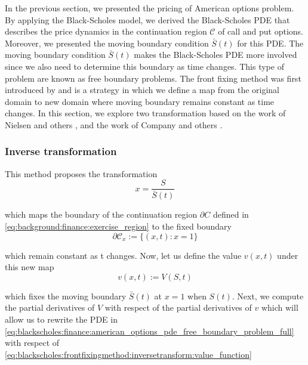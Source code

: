 In the previous section, we presented the pricing of American options problem.
By applying the Black-Scholes model, we derived the Black-Scholes PDE that describes 
the price dynamics in the continuation region $\mathcal{C}$ of call and put options.
Moreover, we presented the moving boundary condition $\bar{S}(t)$ for this PDE.
The moving boundary condition $\bar{S}(t)$ makes the Black-Scholes PDE more 
involved since we also need to determine this boundary as time changes. This type 
of problem are known as free boundary problems. The front fixing method
was first introduced by \cite{landau_1950_heat_ci} and is a strategy in which 
we define a map from the original domain to new domain where moving boundary
remains constant as time changes. In this section, we explore two transformation
based on the work of Nielsen and others \cite{nielsen_2001}, and the work of
Company and others \cite{company_egorova_jodar_2014}.

\subsubsection{Inverse transformation}

This method proposes the transformation 
\begin{equation}
    x = \dfrac{S}{\bar{S}(t)}
    \label{eq:blackscholes:frontfixingmethod:inversetransform}
\end{equation}

which maps the boundary of the continuation region $\partial C$ defined in 
\eqref{eq:background:finance:exercise_region} to the fixed boundary 
\begin{equation}
  \mathcal{\partial C}_x := \{(x, t): x = 1\} 
\end{equation}

which remain constant as t changes. Now, let us define the value $v(x,t)$ 
under this new map
\begin{equation}
  v(x, t) := V(S, t)
  \label{eq:blackscholes:frontfixingmethod:inversetransform:value_function}
\end{equation}

which fixes the moving boundary $\bar{S}(t)$ at $x=1$ when $S(t)$. Next, we compute
the partial derivatives of $V$ with respect of the partial derivatives of $v$ which
will allow us to rewrite the PDE in \eqref{eq:blackscholes:finance:american_options_pde_free_boundary_problem_full} 
with respect of \eqref{eq:blackscholes:frontfixingmethod:inversetransform:value_function}

